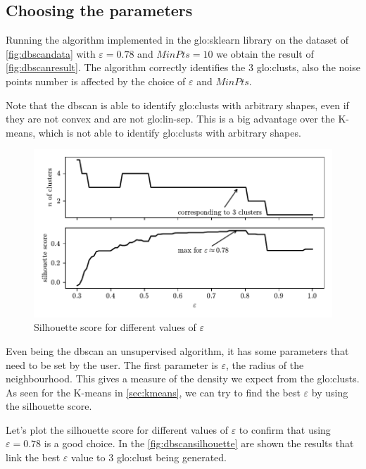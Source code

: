 \subsection{Choosing the parameters}
Running the algorithm implemented in the \gls{glo:sklearn} library on the dataset of \autoref{fig:dbscandata} with $\varepsilon = 0.78$ and $MinPts = 10$ we obtain the result of \autoref{fig:dbscanresult}. The algorithm correctly identifies the $3$ \gls{glo:clust}s, also the noise points number is affected by the choice of $\varepsilon$ and $MinPts$.

Note that the \gls{dbscan} is able to identify \gls{glo:clust}s with arbitrary shapes, even if they are not convex and are not \gls{glo:lin-sep}. This is a big advantage over the K-means, which is not able to identify \gls{glo:clust}s with arbitrary shapes.


\begin{figure}
    \centering
    \includegraphics{images/DBSCAN/Figure_4.pdf}
    \caption{Silhouette score for different values of $\varepsilon$}
    \label{fig:dbscansilhouette}
\end{figure}

Even being the \gls{dbscan} an unsupervised algorithm, it has some parameters that need to be set by the user.
The first parameter is $\varepsilon$, the radius of the neighbourhood. This gives a measure of the density we expect from the \gls{glo:clust}s. As seen for the K-means in \autoref{sec:kmeans}, we can try to find the best $\varepsilon$ by using the silhouette score.

Let's plot the silhouette score for different values of $\varepsilon$ to confirm that using $\varepsilon = 0.78$ is a good choice. In the \autoref{fig:dbscansilhouette} are shown the results that link the best $\varepsilon$ value to $3$ \gls{glo:clust} being generated.

